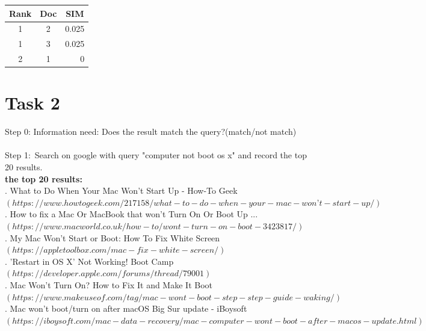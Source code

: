 \documentclass[a4paper]{scrartcl}
\begin{document}
\begin{tabular}{|c|c|r|}
    \hline
    \textbf{Rank} & \textbf{Doc} & \multicolumn{1}{c|}{\textbf{SIM}} \\ \hline
    1             & 2            & 0.025                                   \\ \hline
    1             & 3            & 0.025                             \\ \hline
    2             & 1            & 0                         \\ \hline
\end{tabular}

\clearpage
\section*{Task 2}
Step 0: Information need: Does the result match the query?(match/not match)\\
\\
Step 1:\ Search on google with query "computer not boot os x" and record the top 20 results.\\
\noindent \textbf{the top 20 results:}\\
. What to Do When Your Mac Won't Start Up - How-To Geek\\
\indent\indent $(https://www.howtogeek.com/217158/what-to-do-when-your-mac-won’t-start-up/)$\\
. How to fix a Mac Or MacBook that won't Turn On Or Boot Up ...\\
\indent \indent $(https://www.macworld.co.uk/how-to/wont-turn-on-boot-3423817/)$\\
. My Mac Won’t Start or Boot: How To Fix White Screen\\
\indent \indent $(https://appletoolbox.com/mac-fix-white-screen/)$\\
. 'Restart in OS X' Not Working! Boot Camp\\
\indent \indent $(https://developer.apple.com/forums/thread/79001)$\\
. Mac Won't Turn On? How to Fix It and Make It Boot\\
\indent \indent $(https://www.makeuseof.com/tag/mac-wont-boot-step-step-guide-waking/)$\\
. Mac won't boot/turn on after macOS Big Sur update - iBoysoft\\
\indent \indent $(https://iboysoft.com/mac-data-recovery/mac-computer-wont-boot-after-macos-update.html)$\\
\end{document}
